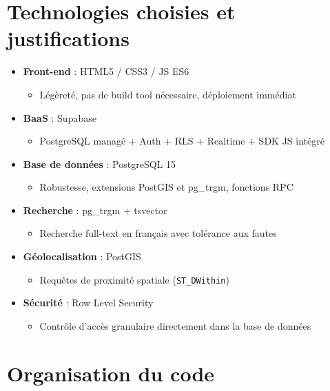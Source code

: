 \documentclass[12pt,a4paper]{report}
\begin{document}
\section{Technologies choisies et justifications}
\begin{itemize}
  \item \textbf{Front-end} : HTML5 / CSS3 / JS ES6
    \begin{itemize}
      \item Légèreté, pas de build tool nécessaire, déploiement immédiat
    \end{itemize}
  
  \item \textbf{BaaS} : Supabase
    \begin{itemize}
      \item PostgreSQL managé + Auth + RLS + Realtime + SDK JS intégré
    \end{itemize}
  
  \item \textbf{Base de données} : PostgreSQL 15
    \begin{itemize}
      \item Robustesse, extensions PostGIS et pg\_trgm, fonctions RPC
    \end{itemize}
  
  \item \textbf{Recherche} : pg\_trgm + tsvector
    \begin{itemize}
      \item Recherche full-text en français avec tolérance aux fautes
    \end{itemize}
  
  \item \textbf{Géolocalisation} : PostGIS
    \begin{itemize}
      \item Requêtes de proximité spatiale (\texttt{ST\_DWithin})
    \end{itemize}
  
  \item \textbf{Sécurité} : Row Level Security
    \begin{itemize}
      \item Contrôle d'accès granulaire directement dans la base de données
    \end{itemize}
\end{itemize}

\section{Organisation du code}
\end{document}
